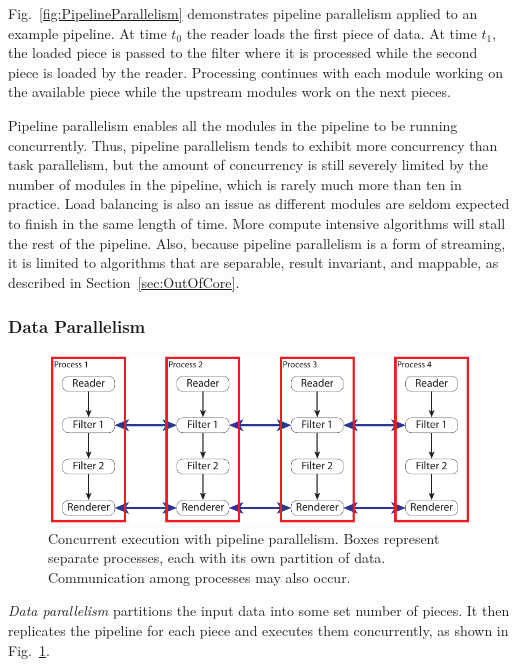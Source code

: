 \documentclass[journal,onecolumn,12pt,letterpaper,twoside]{IEEEtran}
\newcommand*{\figref}[1]{Fig.~\ref{#1}}
\newcommand*{\keyterm}[1]{\emph{#1}}
\begin{document}
\figref{fig:PipelineParallelism} demonstrates pipeline parallelism
applied to an example pipeline.  At time $t_0$ the reader loads the first
piece of data.  At time $t_1$, the loaded piece is passed to the filter
where it is processed while the second piece is loaded by the reader.
Processing continues with each module working on the available piece
while the upstream modules work on the next pieces.

Pipeline parallelism enables all the modules in the pipeline to be
running concurrently.  Thus, pipeline parallelism tends to exhibit more
concurrency than task parallelism, but the amount of concurrency is still
severely limited by the number of modules in the pipeline, which is
rarely much more than ten in practice.  Load balancing is also an issue as
different modules are seldom expected to finish in the same length of
time.  More compute intensive algorithms will stall the rest of the
pipeline.  Also, because pipeline parallelism is a form of streaming, it is
limited to algorithms that are separable, result invariant, and mappable,
as described in Section~\ref{sec:OutOfCore}.

\subsubsection{Data Parallelism}
\label{sec:DataParallelism}

\begin{figure}[htbp]
  \centering
  \includegraphics[scale=1]{images/DataParallel}
  \caption{Concurrent execution with pipeline parallelism.  Boxes represent
    separate processes, each with its own partition of data.  Communication
    among processes may also occur.}
  \label{fig:DataParallelism}
\end{figure}

\keyterm{Data parallelism} partitions the input data into some set number
of pieces.  It then replicates the pipeline for each piece and executes
them concurrently, as shown in \figref{fig:DataParallelism}.
\end{document}
